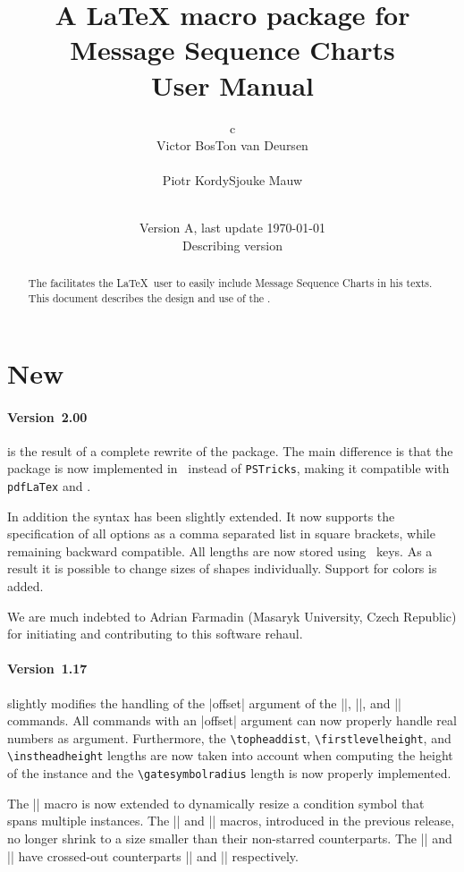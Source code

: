 \documentclass[12pt,a4paper]{article}
\title{
  A \LaTeX{} macro package for Message Sequence Charts\\{\large User Manual}
}
\author{
 \begin{tabular}{c}
  \begin{tabular}{ccc}
   Victor Bos & &
   Ton van Deursen\\
   & & \\
   Piotr Kordy& &
   Sjouke Mauw
  \end{tabular}\\
 \end{tabular}
}
\date{\small Version A\mscversion, last update \today\\
      Describing \mscpack{} version \mscversion}
\begin{document}
\maketitle

\begin{abstract}
\noindent
The \mscpack{} facilitates the \LaTeX\ user to easily include
Message Sequence Charts in his texts. This document describes the
design and use of the \mscpack.
\end{abstract}

\tableofcontents
\section{New}
\label{new}
\paragraph{Version~2.00} is the result of a complete rewrite of the package.
The main difference is that the package is
now implemented in \tikzname\ instead of \verb+PSTricks+, making it
compatible with
\verb+pdfLaTex+ and \beamer.

In addition the syntax has been slightly extended. It now supports the
specification of all options as a comma separated list in square
brackets, while remaining backward compatible. All lengths are now
stored using \pgfname\ keys. As a result it is possible to change
sizes of shapes individually. Support for colors is added.

We are much indebted to Adrian Farmadin (Masaryk University, Czech
Republic) for initiating and contributing to this software rehaul.


\paragraph{Version~1.17} slightly modifies the handling of the
|offset| argument of the |\mess|, |\setstoptimer|, and
|\settimeout| commands. All commands with an |offset|
argument can now properly handle real numbers as
argument. Furthermore, the \verb+\topheaddist+,
\verb+\firstlevelheight+, and \verb+\instheadheight+ lengths are now
taken into account when computing the height of the instance and the
\verb+\gatesymbolradius+ length is now properly implemented.

The |\condition*| macro is now extended to dynamically
resize a condition symbol that spans multiple instances. The
|\condition*| and |\action*| macros, introduced in the
previous release, no longer shrink to a size smaller than their
non-starred counterparts. The |\condition| and
|\action| have crossed-out counterparts |\ncondition| and
|\naction| respectively.
\end{document}
